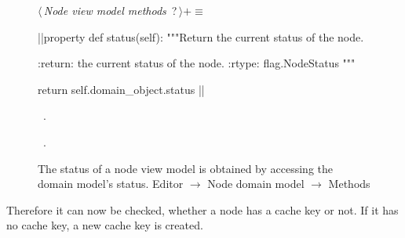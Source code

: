 \documentclass[%
    a4paper,    %
    justified,  %
    nobib,      %
    openany     %
]{tufte-book}
\begin{document}
\begin{figure}
\begin{flushleft} \small
\begin{minipage}{\linewidth}\label{scrap77}\raggedright\small
{} $\langle\,${\itshape Node view model methods}\nobreak\ {\footnotesize {?}}$\,\rangle+\equiv$
\vspace{-1ex}
\begin{pythoncode}
|\normalfont{}\fontfamily{}|property
def status(self):
    """Return the current status of the node.

    :return: the current status of the node.
    :rtype: flag.NodeStatus
    """

    return self.domain_object.status
|\NWsep|
\end{pythoncode}
\vspace{1.5ex}
\footnotesize
\begin{list}{}{\setlength{\itemsep}{-\parsep}\setlength{\itemindent}{-\leftmargin}}
\item \NWtxtMacroDefBy\ .
\item \NWtxtMacroRefIn\ .

\item{}
\end{list}
\end{minipage}\vspace{4ex}
\end{flushleft}
\caption{The status of a node view model is obtained by accessing the domain
  model's status.
  \newline{}\newline{}Editor $\rightarrow$ Node domain model $\rightarrow$
  Methods}
\label{editor:lst:node-view-model:methods:status}
\end{figure}

Therefore it can now be checked, whether a node has a cache key or not. If it
has no cache key, a new cache key is created.
\end{document}
